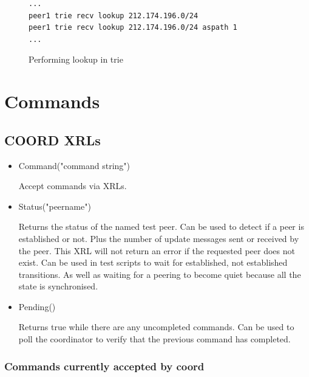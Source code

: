 \documentclass[11pt]{article}
\begin{document}
\begin{figure}[htbp]
\small
\begin{verbatim}
...
peer1 trie recv lookup 212.174.196.0/24
peer1 trie recv lookup 212.174.196.0/24 aspath 1
...
\end{verbatim}
\vspace{-0.1in}
\caption{\label{prog:trie_lookup}Performing lookup in trie}
\end{figure}

\section{Commands}

\subsection{\label{coord:command}COORD XRLs}

\begin{itemize}

  \item Command("command string")

  Accept commands via XRLs.

  \item Status("peername")

  Returns the status of the named test peer. Can be used to detect if a
  peer is established or not. Plus the number of update messages sent
  or received by the peer. This XRL will not return an error if the
  requested peer does not exist. Can be used in test scripts to wait
  for established, not established transitions. As well as waiting for
  a peering to become quiet because all the state is
  synchronised.

  \item Pending()

  Returns true while there are any uncompleted commands. Can be used
  to poll the coordinator to verify that the previous command has
  completed.

\end{itemize}

\subsubsection{Commands currently accepted by coord}
\end{document}
